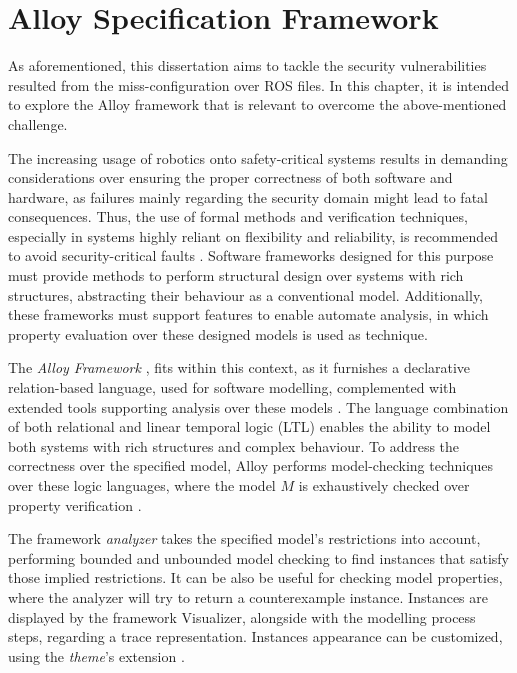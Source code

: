 \chapter{Alloy Specification Framework}\label{c:alloy}

As aforementioned, this dissertation aims to tackle the security vulnerabilities resulted from the miss-configuration over ROS files. In this chapter, it is intended to explore the Alloy framework that is relevant to overcome the above-mentioned challenge. %

The increasing usage of robotics onto safety-critical systems results in demanding considerations over ensuring the proper correctness of both software and hardware, as failures mainly regarding the security domain might lead to fatal consequences. Thus, the use of formal methods and verification techniques, especially in systems highly reliant on flexibility and reliability, is recommended to avoid security-critical faults \cite{clarke2011model}. Software frameworks designed for this purpose must provide methods to perform structural design over systems with rich structures, abstracting their behaviour as a conventional model. Additionally, these frameworks must support features to enable automate analysis, in which property evaluation over these designed models is used as technique. 

The \textit{Alloy Framework} \cite{alloy-DJ}, fits within this context, as it furnishes a declarative relation-based language, used for software modelling, complemented with extended tools supporting analysis over these models \cite{alloy-6}. The language combination of both relational and linear temporal logic (LTL) enables the ability to model both systems with rich structures and complex behaviour. To address the correctness over the specified model, Alloy performs model-checking techniques over these logic languages, where the model $M$ is exhaustively checked over property verification \cite{lwspecification}.

The framework \textit{analyzer} takes the specified model's restrictions into account, performing bounded and unbounded model checking to find instances that satisfy those implied restrictions. It can be also be useful for checking model properties, where the analyzer will try to return a counterexample instance. Instances are displayed by the framework Visualizer, alongside with the modelling process steps, regarding a trace representation. Instances appearance can be customized, using the \textit{theme}'s extension \cite{alloy-6}.

